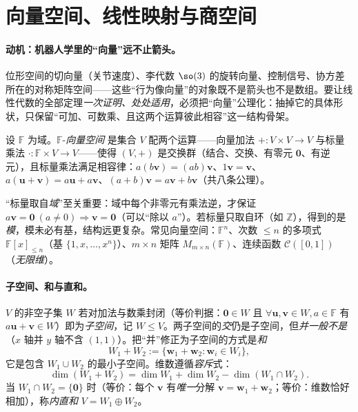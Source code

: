\section{向量空间、线性映射与商空间}
\label{sec:vector-space}

\paragraph{动机：机器人学里的“向量”远不止箭头。}
位形空间的切向量（关节速度）、李代数 $\so(3)$ 的旋转向量、控制信号、协方差所在的对称矩阵空间——这些“行为像向量”的对象既不是箭头也不是数组。要让线性代数的全部定理\emph{一次证明、处处适用}，必须把“向量”公理化：抽掉它的具体形状，只保留“可加、可数乘、且这两个运算彼此相容”这一结构骨架。

\begin{definition}[向量空间]\label{def:vector-space}
设 $\mathbb{F}$ 为域。$\mathbb{F}$-\emph{向量空间} 是集合 $V$ 配两个运算——向量加法 $+:V\times V\to V$ 与标量乘法 $\cdot:\mathbb{F}\times V\to V$——使得 $(V,+)$ 是交换群（结合、交换、有零元 $\mathbf{0}$、有逆元），且标量乘法满足相容律：$a(b\mathbf{v})=(ab)\mathbf{v}$、$1\mathbf{v}=\mathbf{v}$、$a(\mathbf{u}+\mathbf{v})=a\mathbf{u}+a\mathbf{v}$、$(a+b)\mathbf{v}=a\mathbf{v}+b\mathbf{v}$（共八条公理）。
\end{definition}

\noindent “标量取自\emph{域}”至关重要：域中每个非零元有乘法逆，才保证 $a\mathbf{v}=\mathbf{0}\ (a\neq0)\Rightarrow\mathbf{v}=\mathbf{0}$（可以“除以 $a$”）。若标量只取自环（如 $\mathbb{Z}$），得到的是\emph{模}，模未必有基，结构远更复杂。常见向量空间：$\mathbb{F}^n$、次数 $\le n$ 的多项式 $\mathbb{F}[x]_{\le n}$（基 $\{1,x,\dots,x^n\}$）、$m\times n$ 矩阵 $M_{m\times n}(\mathbb{F})$、连续函数 $\mathcal{C}([0,1])$（\emph{无限维}）。

\paragraph{子空间、和与直和。}
$V$ 的非空子集 $W$ 若对加法与数乘封闭（等价判据：$\mathbf{0}\in W$ 且 $\forall\mathbf{u},\mathbf{v}\in W,a\in\mathbb{F}$ 有 $a\mathbf{u}+\mathbf{v}\in W$）即为\emph{子空间}，记 $W\le V$。两子空间的\emph{交}仍是子空间，但\emph{并一般不是}（$x$ 轴并 $y$ 轴不含 $(1,1)$）。把“并”修正为子空间的方式是\emph{和}
\begin{equation}
  W_1+W_2:=\{\mathbf{w}_1+\mathbf{w}_2:\mathbf{w}_i\in W_i\},
  \label{eq:subspace-sum}
\end{equation}
它是包含 $W_1\cup W_2$ 的最小子空间。维数遵循\emph{容斥}式：
\begin{equation}
  \dim(W_1+W_2)=\dim W_1+\dim W_2-\dim(W_1\cap W_2).
  \label{eq:dim-formula}
\end{equation}
当 $W_1\cap W_2=\{\mathbf{0}\}$ 时（等价：每个 $\mathbf{v}$ 有\emph{唯一}分解 $\mathbf{v}=\mathbf{w}_1+\mathbf{w}_2$；等价：维数恰好相加），称\emph{内直和} $V=W_1\oplus W_2$。

